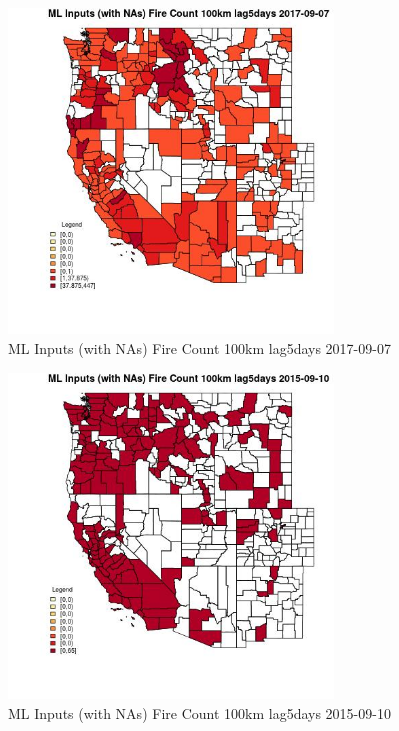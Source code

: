 \begin{figure} 
\centering  
\includegraphics[width=0.77\textwidth]{Code_Outputs/Report_ML_input_PM25_Step4_part_e_de_duplicated_aves_compiled_2019-05-20wNAs_CountyFire_Count_100km_lag5daysMean2017-09-07.jpg} 
\caption{\label{fig:Report_ML_input_PM25_Step4_part_e_de_duplicated_aves_compiled_2019-05-20wNAsCountyFire_Count_100km_lag5daysMean2017-09-07}ML Inputs (with NAs) Fire Count 100km lag5days 2017-09-07} 
\end{figure} 
 

\begin{figure} 
\centering  
\includegraphics[width=0.77\textwidth]{Code_Outputs/Report_ML_input_PM25_Step4_part_e_de_duplicated_aves_compiled_2019-05-20wNAs_CountyFire_Count_100km_lag5daysMean2015-09-10.jpg} 
\caption{\label{fig:Report_ML_input_PM25_Step4_part_e_de_duplicated_aves_compiled_2019-05-20wNAsCountyFire_Count_100km_lag5daysMean2015-09-10}ML Inputs (with NAs) Fire Count 100km lag5days 2015-09-10} 
\end{figure} 
 

